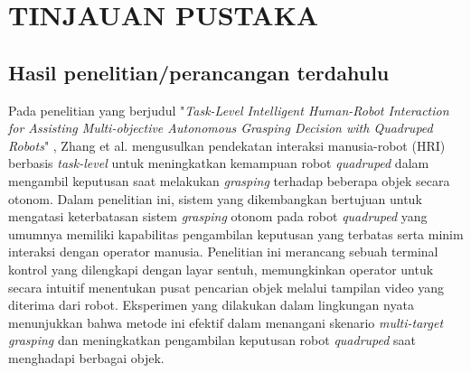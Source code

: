 \chapter{TINJAUAN PUSTAKA}

\section{Hasil penelitian/perancangan terdahulu}

Pada penelitian yang berjudul "\emph{Task-Level Intelligent Human-Robot Interaction
for Assisting Multi-objective Autonomous Grasping Decision with Quadruped Robots}"
\parencite{QifanZhang_tlihrifamoagdwqr}, Zhang et al. mengusulkan pendekatan
interaksi manusia-robot (HRI) berbasis \emph{task-level} untuk meningkatkan kemampuan robot \emph{quadruped}
dalam mengambil keputusan saat melakukan \emph{grasping} terhadap beberapa objek secara otonom.
Dalam penelitian ini, sistem yang dikembangkan bertujuan untuk mengatasi keterbatasan sistem
\emph{grasping} otonom pada robot \emph{quadruped} yang umumnya memiliki kapabilitas pengambilan keputusan
yang terbatas serta minim interaksi dengan operator manusia. Penelitian ini merancang sebuah terminal kontrol
yang dilengkapi dengan layar sentuh, memungkinkan operator untuk secara intuitif menentukan
pusat pencarian objek melalui tampilan video yang diterima dari robot.
Eksperimen yang dilakukan dalam lingkungan nyata menunjukkan bahwa metode ini efektif dalam
menangani skenario \emph{multi-target} \emph{grasping} dan meningkatkan pengambilan keputusan robot \emph{quadruped}
saat menghadapi berbagai objek.


